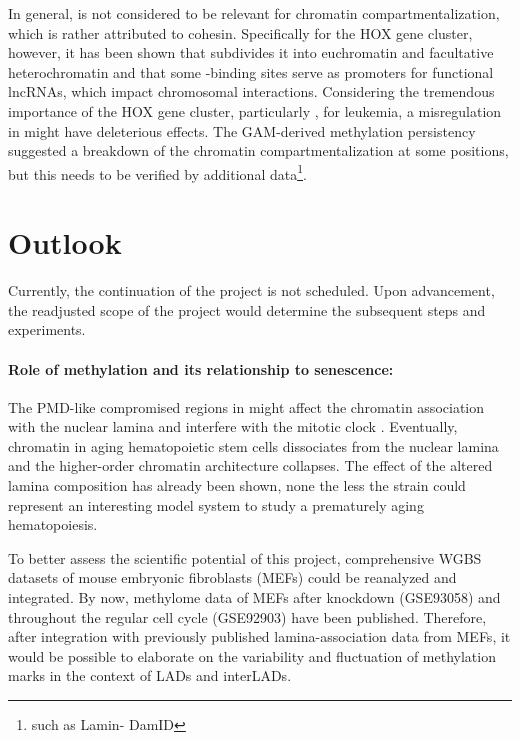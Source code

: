 In general,   is not considered to be relevant for chromatin compartmentalization, which is rather attributed to cohesin\cite{Haarhuis2017}. Specifically for the HOX gene cluster, however, it has been shown that  subdivides it into euchromatin and facultative heterochromatin\cite{Narendra2015} and that some -binding sites serve as promoters for functional lncRNAs, which impact chromosomal interactions\cite{Nwigwe2015}. Considering the tremendous importance of the HOX gene cluster, particularly , for leukemia\cite{Fujino2001,Adamaki2015,Mohr2017}, a misregulation in \dnmtchip might have deleterious effects. The GAM-derived methylation persistency suggested a breakdown of the chromatin compartmentalization at some positions, but this needs to be verified by additional data\footnote{such as Lamin- DamID\cite{Vogel2007}}.

\section{Outlook}
\label{chap:d:methylation:outlook}

Currently, the continuation of the project is not scheduled. Upon advancement, the readjusted scope of the project would determine the subsequent steps and experiments.

\paragraph{Role of methylation and its relationship to senescence:} The PMD-like compromised regions in \dnmtchip might affect the chromatin association with the nuclear lamina and interfere with the mitotic clock . Eventually, chromatin in aging hematopoietic stem cells dissociates from the nuclear lamina and the higher-order chromatin architecture collapses\cite{Grigoryan2018}. The effect of the altered lamina composition has already been shown\cite{Grigoryan2018}, none the less the \dnmtchip strain could represent an interesting model system to study a prematurely aging hematopoiesis.

To better assess the scientific potential of this project, comprehensive WGBS datasets of mouse embryonic fibroblasts (MEFs) could be reanalyzed and integrated. By now, methylome data of MEFs after  knockdown (GSE93058) and throughout the regular cell cycle (GSE92903) have been published\cite{He2017,He2019}. Therefore, after integration with previously published lamina-association data from MEFs\cite{Meuleman2013}, it would be possible to elaborate on the variability and fluctuation of methylation marks in the context of LADs and interLADs. 

